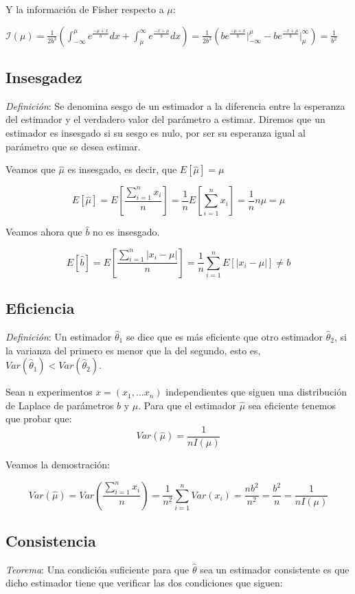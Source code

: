 \documentclass[a4paper, 10pt]{article} %
\begin{document}
		Y la información de Fisher respecto a $\mu$:
		
		$ \displaystyle \mathcal{I}(\mu) = \frac{1}{2b^3} \left(\int^\mu_{-\infty} e^{\frac{-\mu+x}{b}} dx +
		\int^\infty_{\mu} e^{\frac{-x+\mu}{b}} dx \right) =  \frac{1}{2b^3} \left( b e^{\frac{-\mu+x}{b}} \Big|^\mu_{-\infty} -
		b e^{\frac{-x+\mu}{b}} \Big|^\infty_{\mu}\right) = \frac{1}{b^2}$
		
	\subsection{Insesgadez}
		\emph{Definición}: Se denomina sesgo de un estimador a la diferencia entre la esperanza del estimador
		y el verdadero valor del parámetro a estimar. Diremos que un estimador es insesgado si su sesgo es nulo, por ser
		su esperanza igual al parámetro que se desea estimar.
		
		Veamos que $\hat{\mu}$ es insesgado, es decir, que  $E\left[\hat{\mu}\right]=\mu$
		
		$$E\left[\hat{\mu}\right] = E\left[\frac{\sum_{i=1}^{n}x_i}{n}\right] = \frac{1}{n}E\left[\sum_{i=1}^{n}x_i\right] =
		\frac{1}{n}n\mu = \mu $$
		
		Veamos ahora que $\hat{b}$ no es insesgado. 
		
		$$E\left[\hat{b}\right] = E\left[\frac{\sum_{i=1}^{n}|x_i - \mu|}{n}\right] = \frac{1}{n}\sum_{i=1}^{n}E\left[|x_i - \mu|\right] \neq b$$ 
	
	\subsection{Eficiencia}
		\emph{Definición}: Un estimador $\hat{\theta}_1$ se dice que es más eficiente que otro estimador
		$\hat{\theta}_2$, si la varianza del primero es menor que la del segundo, esto es,  $Var(\hat{\theta}_1)<Var(\hat{\theta}_2)$.
		
		Sean n experimentos $x=(x_1,...x_n)$ independientes que siguen una distribución de Laplace de parámetros $b$ y $\mu$.
		Para que el estimador $\hat{\mu}$ sea eficiente tenemos que probar que:
		$$Var(\hat{\mu}) = \frac{1}{nI(\mu)}$$
		
		Veamos la demostración: 
		
		$$Var(\hat{\mu}) = Var\left(\frac{\sum_{i=1}^{n}x_i}{n}\right) = \frac{1}{n^2}\sum_{i=1}^{n}Var(x_i) = \frac{n b^2}{n^2} =
		\frac{b^2}{n} =\frac{1}{nI(\mu)}$$
	
	\subsection{Consistencia}
		\emph{Teorema}: Una condición suficiente para que $\hat{\theta}$ sea un estimador consistente es que
		dicho estimador tiene que verificar las dos condiciones que siguen:
	
\end{document}
